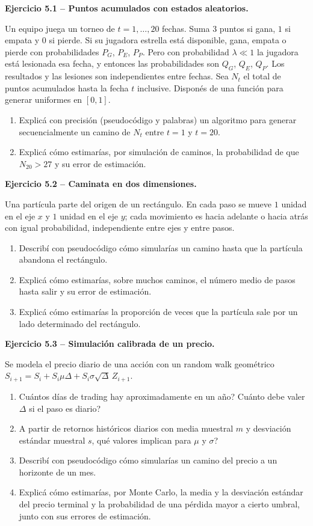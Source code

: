 \documentclass[11pt,a4paper]{article}
\newcommand{\ejercicio}[1]{\par\medskip\noindent\textbf{#1}\par\nopagebreak\smallskip}
\begin{document}
\ejercicio{Ejercicio 5.1 -- Puntos acumulados con estados aleatorios.}
Un equipo juega un torneo de $t=1,\dots,20$ fechas. Suma $3$ puntos si gana, $1$
si empata y $0$ si pierde. Si su jugadora estrella est\'a disponible, gana, empata
o pierde con probabilidades $P_G$, $P_E$, $P_P$. Pero con probabilidad
$\lambda\ll 1$ la jugadora est\'a lesionada esa fecha, y entonces las probabilidades
son $Q_G$, $Q_E$, $Q_P$. Los resultados y las lesiones son independientes entre
fechas. Sea $N_t$ el total de puntos acumulados hasta la fecha $t$ inclusive.
Dispon\'es de una funci\'on para generar uniformes en $[0,1]$.
\begin{enumerate}[label=(\alph*)]
  \item Explic\'a con precisi\'on (pseudoc\'odigo y palabras) un algoritmo para generar
        secuencialmente un camino de $N_t$ entre $t=1$ y $t=20$.
  \item Explic\'a c\'omo estimar\'ias, por simulaci\'on de caminos, la probabilidad de
        que $N_{20}>27$ y su error de estimaci\'on.
\end{enumerate}

\ejercicio{Ejercicio 5.2 -- Caminata en dos dimensiones.}
Una part\'icula parte del origen de un rect\'angulo. En cada paso se mueve $1$
unidad en el eje $x$ y $1$ unidad en el eje $y$; cada movimiento es hacia adelante
o hacia atr\'as con igual probabilidad, independiente entre ejes y entre pasos.
\begin{enumerate}[label=(\alph*)]
  \item Describ\'i con pseudoc\'odigo c\'omo simular\'ias un camino hasta que la part\'icula
        abandona el rect\'angulo.
  \item Explic\'a c\'omo estimar\'ias, sobre muchos caminos, el n\'umero medio de pasos
        hasta salir y su error de estimaci\'on.
  \item Explic\'a c\'omo estimar\'ias la proporci\'on de veces que la part\'icula sale por
        un lado determinado del rect\'angulo.
\end{enumerate}

\ejercicio{Ejercicio 5.3 -- Simulaci\'on calibrada de un precio.}
Se modela el precio diario de una acci\'on con un random walk geom\'etrico
$S_{i+1}=S_i+S_i\mu\Delta+S_i\sigma\sqrt{\Delta}\,Z_{i+1}$.
\begin{enumerate}[label=(\alph*)]
  \item \textquestiondown{}Cu\'antos d\'ias de trading hay aproximadamente en un a\~no? \textquestiondown{}Cu\'anto debe
        valer $\Delta$ si el paso es diario?
  \item A partir de retornos hist\'oricos diarios con media muestral $m$ y desviaci\'on
        est\'andar muestral $s$, \textquestiondown{}qu\'e valores implican para $\mu$ y $\sigma$?
  \item Describ\'i con pseudoc\'odigo c\'omo simular\'ias un camino del precio a un
        horizonte de un mes.
  \item Explic\'a c\'omo estimar\'ias, por Monte Carlo, la media y la desviaci\'on
        est\'andar del precio terminal y la probabilidad de una p\'erdida mayor a
        cierto umbral, junto con sus errores de estimaci\'on.
\end{enumerate}
\end{document}
